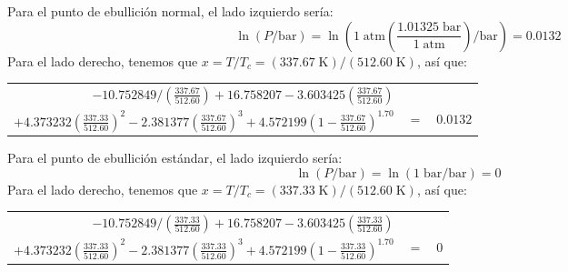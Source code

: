 \documentclass[a4paper,12pt]{article}
\begin{document}
\begin{enumerate}
Para el punto de ebullici\'on normal, el lado izquierdo ser\'ia:
$$\ln (P/\mbox{bar})=\ln\left(1\;\mbox{atm}\left(\frac{1.01325\;\mbox{bar}}{1\;\mbox{atm}}\right)/\mbox{bar}\right)=0.0132$$
Para el lado derecho, tenemos que $x=T/T_c=(337.67\;\mbox{K})/(512.60\;\mbox{K})$, as\'i que:

\begin{tabular}{r c l}
$-10.752849/\left(\frac{337.67}{512.60}\right)+16.758207-3.603425(\frac{337.67}{512.60})$ & & \\
$+4.373232(\frac{337.33}{512.60})^2-2.381377(\frac{337.67}{512.60})^3+4.572199\left(1-\frac{337.67}{512.60}\right)^{1.70}$ & $=$ & $0.0132$ 
\end{tabular}

Para el punto de ebullici\'on est\'andar, el lado izquierdo ser\'ia:
$$\ln (P/\mbox{bar})=\ln (1\;\mbox{bar}/\mbox{bar})=0$$
Para el lado derecho, tenemos que $x=T/T_c=(337.33\;\mbox{K})/(512.60\;\mbox{K})$, as\'i que:

\begin{tabular}{r c l}
$-10.752849/\left(\frac{337.33}{512.60}\right)+16.758207-3.603425(\frac{337.33}{512.60})$ & & \\
$+4.373232(\frac{337.33}{512.60})^2-2.381377(\frac{337.33}{512.60})^3+4.572199\left(1-\frac{337.33}{512.60}\right)^{1.70}$ & $=$ & $0$
\end{tabular}

\end{enumerate}
 
\end{document}
